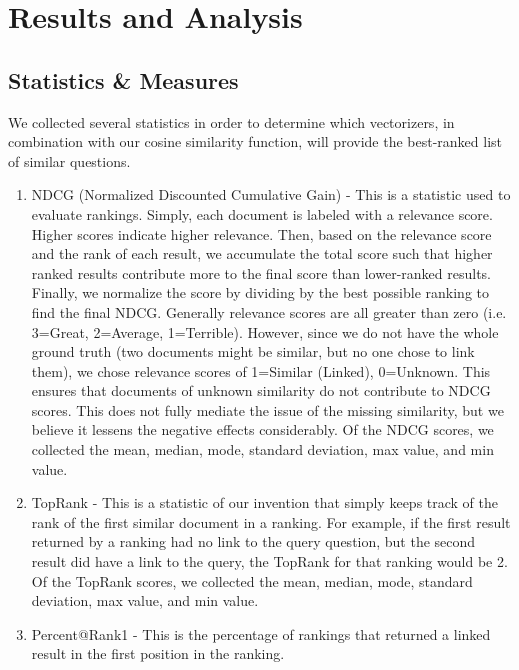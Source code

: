 \documentclass{acm_proc_article-sp}
\begin{document}
\section{Results and Analysis}
\subsection{Statistics \& Measures}
We collected several statistics in order to determine which vectorizers, in combination with our cosine similarity function, will provide the best-ranked list of similar questions. 
\begin{enumerate}[noitemsep]
	\item NDCG (Normalized Discounted Cumulative Gain) - This is a statistic used to evaluate rankings. Simply, each document is labeled with a relevance score. Higher scores indicate higher relevance. Then, based on the relevance score and the rank of each result, we accumulate the total score such that higher ranked results contribute more to the final score than lower-ranked results. Finally, we normalize the score by dividing by the best possible ranking to find the final NDCG. 
Generally relevance scores are all greater than zero (i.e. 3=Great, 2=Average, 1=Terrible). However, since we do not have the whole ground truth (two documents might be similar, but no one chose to link them), we chose relevance scores of 1=Similar (Linked), 0=Unknown. This ensures that documents of unknown similarity do not contribute to NDCG scores. This does not fully mediate the issue of the missing similarity, but we believe it lessens the negative effects considerably.
Of the NDCG scores, we collected the mean, median, mode, standard deviation, max value, and min value.
	\item TopRank - This is a statistic of our invention that simply keeps track of the rank of the first similar document in a ranking. For example, if the first result returned by a ranking had no link to the query question, but the second result did have a link to the query, the TopRank for that ranking would be 2. Of the TopRank scores, we collected the mean, median, mode, standard deviation, max value, and min value.
	\item Percent@Rank1 - This is the percentage of rankings that returned a linked result in the first position in the ranking.
\end{enumerate}
\end{document}
